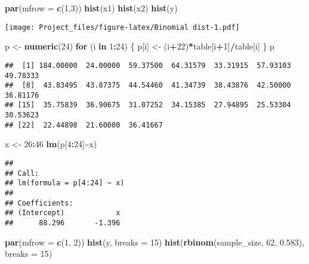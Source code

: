 \documentclass[
]{article}
\newenvironment{Shaded}{\begin{snugshade}}{\end{snugshade}}
\newcommand{\AttributeTok}[1]{\textcolor[rgb]{0.13,0.29,0.53}{#1}}
\newcommand{\ControlFlowTok}[1]{\textcolor[rgb]{0.13,0.29,0.53}{\textbf{#1}}}
\newcommand{\DecValTok}[1]{\textcolor[rgb]{0.00,0.00,0.81}{#1}}
\newcommand{\FloatTok}[1]{\textcolor[rgb]{0.00,0.00,0.81}{#1}}
\newcommand{\FunctionTok}[1]{\textcolor[rgb]{0.13,0.29,0.53}{\textbf{#1}}}
\newcommand{\NormalTok}[1]{#1}
\newcommand{\OtherTok}[1]{\textcolor[rgb]{0.56,0.35,0.01}{#1}}
\newcommand{\SpecialCharTok}[1]{\textcolor[rgb]{0.81,0.36,0.00}{\textbf{#1}}}
\begin{document}
\begin{Shaded}
\begin{Highlighting}[]
\FunctionTok{par}\NormalTok{(}\AttributeTok{mfrow =} \FunctionTok{c}\NormalTok{(}\DecValTok{1}\NormalTok{,}\DecValTok{3}\NormalTok{))}
\FunctionTok{hist}\NormalTok{(x1)}
\FunctionTok{hist}\NormalTok{(x2)}
\FunctionTok{hist}\NormalTok{(y)}
\end{Highlighting}
\end{Shaded}

\texttt{[image: Project\_files/figure-latex/Binomial dist-1.pdf]}

\begin{Shaded}
\begin{Highlighting}[]
\NormalTok{p }\OtherTok{\textless{}{-}} \FunctionTok{numeric}\NormalTok{(}\DecValTok{24}\NormalTok{)}
\ControlFlowTok{for}\NormalTok{ (i }\ControlFlowTok{in} \DecValTok{1}\SpecialCharTok{:}\DecValTok{24}\NormalTok{) \{}
\NormalTok{  p[i] }\OtherTok{\textless{}{-}}\NormalTok{ (i}\SpecialCharTok{+}\DecValTok{22}\NormalTok{)}\SpecialCharTok{*}\NormalTok{table[i}\SpecialCharTok{+}\DecValTok{1}\NormalTok{]}\SpecialCharTok{/}\NormalTok{table[i]}
\NormalTok{\}}
\NormalTok{p}
\end{Highlighting}
\end{Shaded}

\begin{verbatim}
##  [1] 184.00000  24.00000  59.37500  64.31579  33.31915  57.93103  49.78333
##  [8]  43.83495  43.87375  44.54460  41.34739  38.43876  42.50000  36.81176
## [15]  35.75839  36.90675  31.07252  34.15385  27.94895  25.53304  30.53623
## [22]  22.44898  21.60000  36.41667
\end{verbatim}

\begin{Shaded}
\begin{Highlighting}[]
\NormalTok{x }\OtherTok{\textless{}{-}} \DecValTok{26}\SpecialCharTok{:}\DecValTok{46}
\FunctionTok{lm}\NormalTok{(p[}\DecValTok{4}\SpecialCharTok{:}\DecValTok{24}\NormalTok{]}\SpecialCharTok{\textasciitilde{}}\NormalTok{x)}
\end{Highlighting}
\end{Shaded}

\begin{verbatim}
## 
## Call:
## lm(formula = p[4:24] ~ x)
## 
## Coefficients:
## (Intercept)            x  
##      88.296       -1.396
\end{verbatim}

\begin{Shaded}
\begin{Highlighting}[]
\FunctionTok{par}\NormalTok{(}\AttributeTok{mfrow =} \FunctionTok{c}\NormalTok{(}\DecValTok{1}\NormalTok{, }\DecValTok{2}\NormalTok{))}
\FunctionTok{hist}\NormalTok{(y, }\AttributeTok{breaks =} \DecValTok{15}\NormalTok{)}
\FunctionTok{hist}\NormalTok{(}\FunctionTok{rbinom}\NormalTok{(sample\_size, }\DecValTok{62}\NormalTok{, }\FloatTok{0.583}\NormalTok{), }\AttributeTok{breaks =} \DecValTok{15}\NormalTok{)}
\end{Highlighting}
\end{Shaded}
\end{document}
